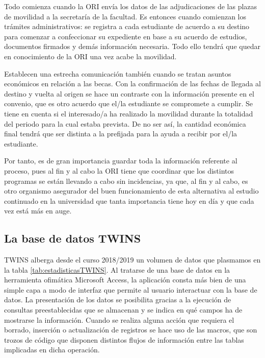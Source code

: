 Todo comienza cuando la ORI envía los datos de las adjudicaciones de las plazas de movilidad a la secretaría de la facultad. Es entonces cuando comienzan los trámites administrativos: se registra a cada estudiante de acuerdo a su destino para comenzar a confeccionar su expediente en base a su acuerdo de estudios, documentos firmados y demás información necesaria. Todo ello tendrá que quedar en conocimiento de la ORI una vez acabe la movilidad.

Establecen una estrecha comunicación también cuando se tratan asuntos económicos en relación a las becas. Con la confirmación de las fechas de llegada al destino y vuelta al origen se hace un contraste con la información presente en el convenio, que es otro acuerdo que el/la estudiante se compromete a cumplir. Se tiene en cuenta si el interesado/a ha realizado la movilidad durante la totalidad del periodo para la cual estaba prevista. De no ser así, la cantidad económica final tendrá que ser distinta a la prefijada para la ayuda a recibir por el/la estudiante.

Por tanto, es de gran importancia guardar toda la información referente al proceso, pues al fin y al cabo la ORI tiene que coordinar que los distintos programas se están llevando a cabo sin incidencias, ya que, al fin y al cabo, es otro organismo asegurador del buen funcionamiento de esta alternativa al estudio continuado en la universidad que tanta importancia tiene hoy en día y que cada vez está más en auge.

\subsection{La base de datos TWINS}


TWINS alberga desde el curso 2018/2019 un volumen de datos que plasmamos en la tabla \ref{tab:estadisticasTWINS}. Al tratarse de una base de datos en la herramienta ofimática Microsoft Access\textregistered, la aplicación consta más bien de una simple capa a modo de interfaz que permite al usuario interactuar con la base de datos. La presentación de los datos se posibilita gracias a la ejecución de consultas preestablecidas que se almacenan y se indica en qué campos ha de mostrarse la información. Cuando se realiza alguna acción que requiera el borrado, inserción o actualización de registros se hace uso de las macros, que son trozos de código que disponen distintos flujos de información entre las tablas implicadas en dicha operación.

